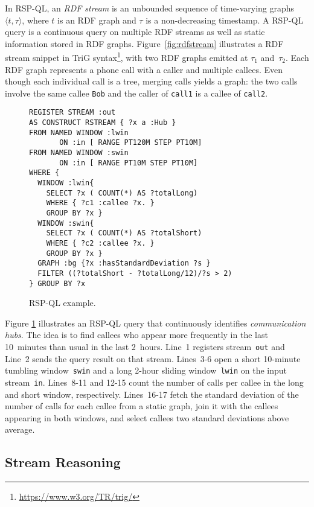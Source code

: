 In RSP-QL, an \textit{RDF stream} is an unbounded sequence of
time-varying graphs $\langle t,\tau\rangle$, where $t$ is an RDF graph
and $\tau$ is a non-decreasing timestamp.  A RSP-QL query is a
continuous query on multiple RDF streams as well as static information
stored in RDF graphs.  Figure~\ref{fig:rdfstream} illustrates a RDF
stream snippet in TriG
syntax\footnote{\url{https://www.w3.org/TR/trig/}}, with two RDF
graphs emitted at $\tau_1$ and~$\tau_2$. Each RDF graph represents a
phone call with a caller and multiple callees. Even though each
individual call is a tree, merging calls yields a graph: the two calls
involve the same callee \lstinline{Bob} and the caller of
\lstinline{call1} is a callee of \lstinline{call2}.

\begin{figure}[!h]
\begin{lstlisting}[language=rsp-ql]
REGISTER STREAM :out
AS CONSTRUCT RSTREAM { ?x a :Hub }
FROM NAMED WINDOW :lwin
       ON :in [ RANGE PT120M STEP PT10M]
FROM NAMED WINDOW :swin
       ON :in [ RANGE PT10M STEP PT10M]
WHERE {
  WINDOW :lwin{
    SELECT ?x ( COUNT(*) AS ?totalLong)
    WHERE { ?c1 :callee ?x. }
    GROUP BY ?x }
  WINDOW :swin{
    SELECT ?x ( COUNT(*) AS ?totalShort)
    WHERE { ?c2 :callee ?x. }
    GROUP BY ?x }
  GRAPH :bg {?x :hasStandardDeviation ?s }
  FILTER ((?totalShort - ?totalLong/12)/?s > 2)
} GROUP BY ?x
\end{lstlisting}
\vspace*{-4mm}
\caption{\label{fig:rspql}RSP-QL example.}
\end{figure}

Figure \ref{fig:rspql} illustrates an RSP-QL query that continuously
identifies \textit{communication hubs}. The idea is to find callees
who appear more frequently in the last 10~minutes than usual in the
last 2~hours. Line~1 registers stream~\lstinline{out} and Line~2 sends
the query result on that stream. \mbox{Lines 3-6} open a short
10-mi\-nute tumbling window~\lstinline{swin} and a long \mbox{2-hour}
sliding window~\lstinline{lwin} on the input
stream~\lstinline{in}. \mbox{Lines 8-11} and \mbox{12-15} count the
number of calls per callee in the long and short window,
respectively. \mbox{Lines 16-17} fetch the standard deviation of the
number of calls for each callee from a static graph, join it with the
callees appearing in both windows, and select callees two
standard deviations above average.

\subsection{Stream Reasoning}\label{sec:sr} %

